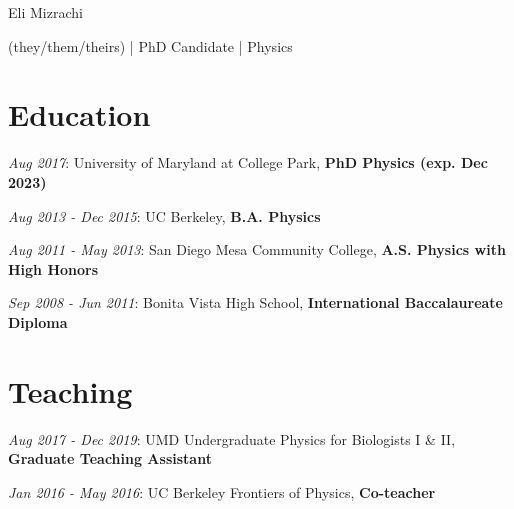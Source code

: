 \documentclass[
  10pt,
]{scrartcl}
\author{}
\date{}
\begin{document}

\ifdefined\Shaded\renewenvironment{Shaded}{\begin{tcolorbox}[breakable, sharp corners, interior hidden, frame hidden, enhanced, borderline west={3pt}{0pt}{shadecolor}, boxrule=0pt]}{\end{tcolorbox}}\fi

\begin{center}

\begin{LARGE}Eli Mizrachi\end{LARGE}

\begin{small}(they/them/theirs) | PhD Candidate | Physics\end{small}

\href{mailto:emiz@umd.edu}{}
\href{https://e-miz.github.io}{}

\end{center}

\hypertarget{fa-user-graduate-education}{%
\section{\texorpdfstring{
Education}{ Education}}\label{fa-user-graduate-education}}

\textcolor{mygray}{\textit{Aug 2017}}: University of Maryland at College
Park, \textbf{PhD Physics (exp. Dec 2023)}

\textcolor{mygray}{\textit{Aug 2013 - Dec 2015}}: UC Berkeley,
\textbf{B.A. Physics}

\textcolor{mygray}{\textit{Aug 2011 - May 2013}}: San Diego Mesa
Community College, \textbf{A.S. Physics with High Honors}

\textcolor{mygray}{\textit{Sep 2008 - Jun 2011}}: Bonita Vista High
School, \textbf{International Baccalaureate Diploma}

\hypertarget{fa-school-teaching}{%
\section{\texorpdfstring{
Teaching}{ Teaching}}\label{fa-school-teaching}}

\textcolor{mygray}{\textit{Aug 2017 - Dec 2019}}: UMD Undergraduate
Physics for Biologists I \& II, \textbf{Graduate Teaching Assistant}

\textcolor{mygray}{\textit{Jan 2016 - May 2016}}: UC Berkeley Frontiers
of Physics, \textbf{Co-teacher}
\end{document}
